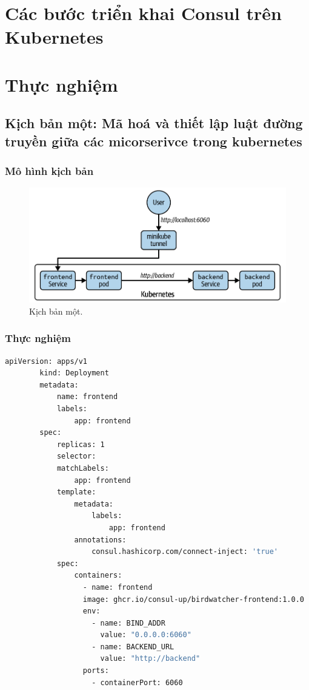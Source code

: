 \documentclass[12pt,a4paper]{report}
\begin{document}
	\section{Các bước triển khai Consul trên Kubernetes}
	\section{Thực nghiệm}
	\subsection{Kịch bản một: Mã hoá và thiết lập luật đường truyền giữa các micorserivce trong kubernetes}
	\subsubsection{Mô hình kịch bản}
	 \begin{figure}[h]
		\centering
		\includegraphics[width=0.7\linewidth]{Pics/kb1}
		\caption{\label{fig:kb1} Kịch bản một.}
		\label{fig:kb1}
	\end{figure}
	
	\hspace{1.0cm}{Ở trong kịch bản này, mục tiêu của chúng ta là sẽ tiến hành mã hoá và thiết lập các luật cho microservice. Các cách mã hoá sẽ được giải thích ở phần bên dưới.}
	\subsubsection{Thực nghiệm}
	\hspace{1.0cm}{Đầu tiên, chúng ta có tạo một tệp tin cấu hình của ứng dụng và service dành cho frontend, nội dung của tệp tin đó như sau:}
	\begin{lstlisting}[language=Bash]
		apiVersion: apps/v1
		kind: Deployment
		metadata:
			name: frontend
			labels:
				app: frontend
		spec:
			replicas: 1
			selector:
			matchLabels:
				app: frontend
			template:
				metadata:
					labels:
						app: frontend
				annotations:
					consul.hashicorp.com/connect-inject: 'true'
			spec:
				containers:
				  - name: frontend
				  image: ghcr.io/consul-up/birdwatcher-frontend:1.0.0
				  env:
					- name: BIND_ADDR
					  value: "0.0.0.0:6060"
					- name: BACKEND_URL
					  value: "http://backend"
				  ports:
				    - containerPort: 6060
	\end{lstlisting}
\end{document}
